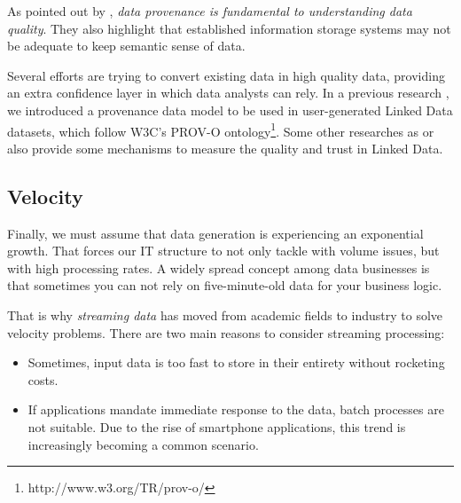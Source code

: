 As pointed out by \cite{buneman2013data}, \textit{data provenance is fundamental to understanding data quality}. They also highlight that established information storage systems may not be adequate to keep semantic sense of data.

Several efforts are trying to convert existing data in high quality data, providing an extra confidence layer in which data analysts can rely. In a previous research \cite{emalditrust}, we introduced a provenance data model to be used in user-generated Linked Data datasets, which follow W3C's PROV-O ontology\footnote{http://www.w3.org/TR/prov-o/}. Some other researches as \cite{hartig_using_2009} or \cite{bizer_quality_2009} also provide some mechanisms to measure the quality and trust in Linked Data.

\subsection{Velocity}

Finally, we must assume that data generation is experiencing an exponential growth. That forces our IT structure to not only tackle with volume issues, but with high processing rates. A widely spread concept among data businesses is that sometimes you can not rely on five-minute-old data for your business logic.

That is why \textit{streaming data} has moved from academic fields to industry to solve velocity problems. There are two main reasons to consider streaming processing:
\begin{itemize}
	\item Sometimes, input data is too fast to store in their entirety without rocketing costs.
	\item If applications mandate immediate response to the data, batch processes are not suitable. Due to the rise of smartphone applications, this trend is increasingly becoming a common scenario.
\end{itemize}
